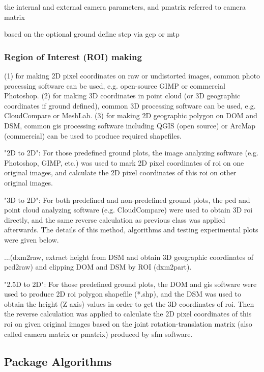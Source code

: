 \documentclass{configs/bmcart}
\begin{document}
the internal and external camera parameters, and pmatrix referred to camera matrix


based on the optional ground define step via \acrfull*{gcp} or \acrfull*{mtp}

\subsubsection*{Region of Interest (ROI) making}
(1) for making 2D pixel coordinates on raw or undistorted images, common photo processing software can be used, e.g. open-source GIMP or commercial Photoshop. (2) for making 3D coordinates in point cloud (or 3D geographic coordinates if ground defined), common 3D processing software can be used, e.g. CloudCompare or MeshLab. (3) for making 2D geographic polygon on DOM and DSM, common \acrfull*{gis} processing software including QGIS (open source) or ArcMap (commercial) can be used to produce required shapefiles.

"2D to 2D": For those predefined ground plots, the image analyzing software (e.g. Photoshop, GIMP, etc.) was used to mark 2D pixel coordinates of \acrshort*{roi} on one original images, and calculate the 2D pixel coordinates of this \acrshort*{roi} on other original images.

"3D to 2D": For both predefined and non-predefined ground plots, the \acrfull*{pcd} and point cloud analyzing software (e.g. CloudCompare) were used to obtain 3D \acrshort*{roi} directly, and the same reverse calculation as previous class was applied afterwards. The details of this method, algorithms and testing experimental plots were given below.

...(dxm2raw, extract height from DSM and obtain 3D geographic coordinates of pcd2raw) and clipping DOM and DSM by ROI (dxm2part).

"2.5D to 2D": For those predefined ground plots, the DOM and \acrfull*{gis} software were used to produce 2D \acrshort*{roi} polygon shapefile (*.shp), and the DSM was used to obtain the height (Z axis) values in order to get the 3D coordinates of \acrshort*{roi}. Then the reverse calculation was applied to calculate the 2D pixel coordinates of this \acrshort*{roi} on given original images based on the joint rotation-translation matrix (also called camera matrix or pmatrix) produced by \acrshort*{sfm} software.

\subsection*{Package Algorithms}
\end{document}
